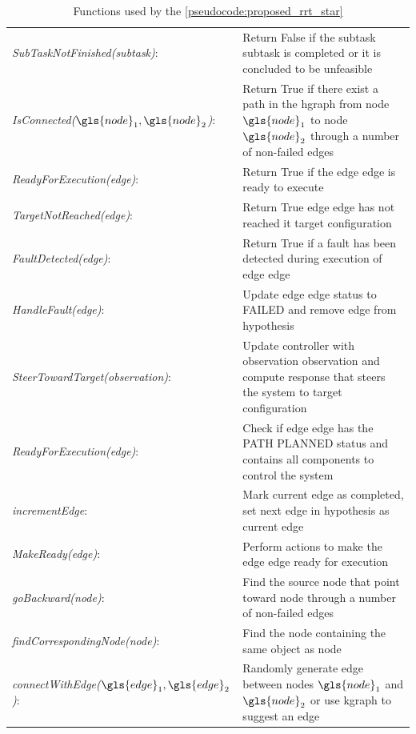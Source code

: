 \begin{table}[H]
\centering
\begin{tabular}[t]{l p{10cm}}
\textit{SubTaskNotFinished(\gls{subtask})}:& Return False if the subtask \gls{subtask} is completed or it is concluded to be unfeasible \\
\textit{IsConnected($\gls{node}_1, \gls{node}_2$)}:& Return True if there exist a path in the \ac{hgraph} from node $\gls{node}_1$  to node $\gls{node}_2$ through a number of non-failed edges\\
\textit{ReadyForExecution(\gls{edge})}: & Return True if the edge \gls{edge} is ready to execute\\
\textit{TargetNotReached(\gls{edge})}: & Return True edge \gls{edge} has not reached it target configuration\\
\textit{FaultDetected(\gls{edge})}: & Return True if a fault has been detected during execution of edge \gls{edge}\\

\textit{HandleFault(\gls{edge})}: & Update edge \gls{edge} status to FAILED and remove edge from hypothesis \\
\textit{SteerTowardTarget(\gls{observation})}: & Update controller with observation \gls{observation} and compute response that steers the system to target configuration\\
\textit{ReadyForExecution(\gls{edge})}: & Check if edge \gls{edge} has the PATH PLANNED status and contains all components to control the system \\
\textit{incrementEdge}: & Mark current edge as completed, set next edge in \gls{hypothesis} as current edge \\
\textit{MakeReady(\gls{edge})}: & Perform actions to make the edge \gls{edge} ready for execution \\
\textit{goBackward(\gls{node})}: & Find the source node that point toward \gls{node} through a number of non-failed edges\\
\textit{findCorrespondingNode(\gls{node})}: & Find the node containing the same object as \gls{node} \\
\textit{connectWithEdge($\gls{edge}_1, \gls{edge}_2$)}: & Randomly generate edge between nodes $\gls{node}_1$ and $\gls{node}_2$ or use \ac{kgraph} to suggest an edge\\
\end{tabular}
\caption{Functions used by the \cref{pseudocode:proposed_rrt_star}}
\label{table:functions_for_halgorithm}
\end{table}

